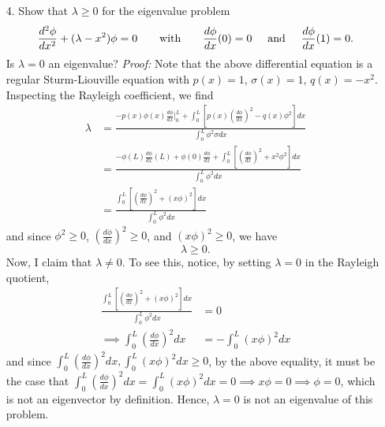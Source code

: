 \documentclass{article}
\begin{document}
\begin{itemize}
    \pagebreak
    \item[4.] Show that $\lambda \geq 0$ for the eigenvalue problem
    \[\frac{d^2\phi}{dx^2} + (\lambda - x^2)\phi = 0 \hspace{0.7cm} \text{with} \hspace{0.7cm} \frac{d\phi}{dx}(0) = 0 \hspace{0.5cm} \text{and} \hspace{0.5cm} \frac{d\phi}{dx}(1) = 0.\]
    Is $\lambda = 0$ an eigenvalue?
    \newline\newline
    \textit{Proof:} Note that the above differential equation is a regular Sturm-Liouville equation with $p(x) = 1$, $\sigma(x) = 1$, $q(x) = -x^2$. Inspecting the Rayleigh coefficient, we find
    \begin{align*}
        \lambda &= \frac{-p(x)\phi(x)\frac{d\phi}{dx}\big|_0^L + \int_0^L \left[p(x)\left(\frac{d\phi}{dx}\right)^2 - q(x)\phi^2\right]dx}{\int_0^L \phi^2\sigma dx}\\
        &= \frac{-\phi(L)\frac{d\phi}{dx}(L) + \phi(0)\frac{d\phi}{dx} + \int_0^L \left[\left(\frac{d\phi}{dx}\right)^2 + x^2\phi^2\right]dx}{\int_0^L\phi^2dx}\\
        &= \frac{\int_0^L \left[\left(\frac{d\phi}{dx}\right)^2 + (x\phi)^2\right]dx}{\int_0^L \phi^2dx}
    \end{align*}
    and since $\phi^2 \geq 0$, $\left(\frac{d\phi}{dx}\right)^2 \geq 0$, and $(x\phi)^2 \geq 0$, we have
    \[\lambda \geq 0.\]
    Now, I claim that $\lambda \neq 0$. To see this, notice, by setting $\lambda = 0$ in the Rayleigh quotient,
    \begin{align*}
        \frac{\int_0^L \left[\left(\frac{d\phi}{dx}\right)^2 + (x\phi)^2\right]dx}{\int_0^L \phi^2 dx} &= 0\\
        \implies \int_0^L\left(\frac{d\phi}{dx}\right)^2dx &= -\int_0^L (x\phi)^2dx
    \end{align*}
    and since $\int_0^L \left(\frac{d\phi}{dx}\right)^2dx, \int_0^L (x\phi)^2dx \geq 0$, by the above equality, it must be the case that $\int_0^L\left(\frac{d\phi}{dx}\right)^2dx = \int_0^L (x\phi)^2 dx = 0 \implies x\phi = 0 \implies \phi = 0$, which is not an eigenvector by definition. Hence, $\lambda = 0$ is not an eigenvalue of this problem. 


\end{itemize}
\end{document}
